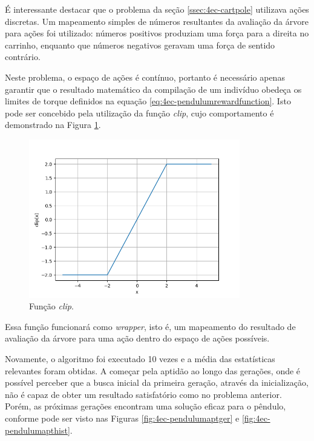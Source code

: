 É interessante destacar que o problema da seção \ref{ssec:4ec-cartpole} utilizava ações discretas. Um mapeamento simples de números resultantes da avaliação da árvore para ações foi utilizado: números positivos produziam uma força para a direita no carrinho, enquanto que números negativos geravam uma força de sentido contrário. 

Neste problema, o espaço de ações é contínuo, portanto é necessário apenas garantir que o resultado matemático da compilação de um indivíduo obedeça os limites de torque definidos na equação \ref{eq:4ec-pendulumrewardfunction}. Isto pode ser concebido pela utilização da função \textit{clip}, cujo comportamento é demonstrado na Figura \ref{fig:4ec-pendulumclip}.

\begin{figure}[H]
	\centering
	\includegraphics[width=0.82\textwidth]{02_desenvolvimento/04_EC_Fig_PendulumClipFun.png}
	\caption{Função \textit{clip}.}
	\label{fig:4ec-pendulumclip}
\end{figure}

Essa função funcionará como \textit{wrapper}, isto é, um mapeamento do resultado de avaliação da árvore para uma ação dentro do espaço de ações possíveis.

Novamente, o algoritmo foi executado 10 vezes e a média das estatísticas relevantes foram obtidas. A começar pela aptidão ao longo das gerações, onde é possível perceber que a busca inicial da primeira geração, através da inicialização, não é capaz de obter um resultado satisfatório como no problema anterior. Porém, as próximas gerações encontram uma solução eficaz para o pêndulo, conforme pode ser visto nas Figuras \ref{fig:4ec-pendulumaptger} e \ref{fig:4ec-pendulumapthist}.

